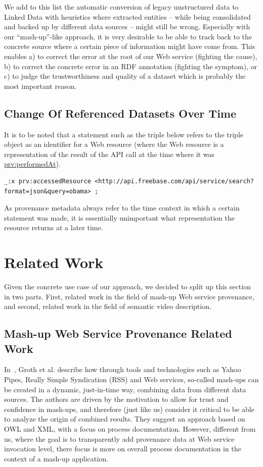\documentclass[conference]{IEEEtran}
\begin{document}
We add to this list the automatic conversion of legacy unstructured data to Linked Data with heuristics where extracted
entities -- while being consolidated and backed up by different data sources -- might still be wrong. Especially with our
``mash-up''-like approach, it is very desirable to be able to track back to the concrete source where a certain piece
of information might have come from. This enables a) to correct the error at the root of our Web service (fighting the
cause), b) to correct the concrete error in an RDF annotation (fighting the symptom), or c) to judge the
trustworthiness and quality of a dataset which is probably the most important reason.

\subsection{Change Of Referenced Datasets Over Time}                        \label{sec:change}
It is to be noted that a statement such as the triple below refers to the triple object as an identifier for a Web
resource (where the Web resource is a representation of the result of the API call at the time where it was
\url{prv:performedAt}).
\begin{lstlisting}
_:x prv:accessedResource <http://api.freebase.com/api/service/search?format=json&query=obama> ;
\end{lstlisting}
As provenance metadata always refer to the time context in which a certain statement was made, it is essentially
unimportant what representation the resource returns at a later time.


\section{Related Work}\label{sec:related}
Given the concrete use case of our approach, we decided to split up this section in two parts. First, related work in the field of mash-up Web service provenance, and second, related work in the field of semantic video description.

\subsection{Mash-up Web Service Provenance Related Work}
In~\cite{Groth:2009:MPD:1462159.1462162}, Groth et al. describe how through tools and technologies such as Yahoo Pipes, Really Simple Syndication (RSS) and Web services, so-called mash-ups can be created in a dynamic, just-in-time way, combining data from different data sources. The authors are driven by the motivation to allow for trust and confidence in mash-ups, and therefore (just like us) consider it critical to be able to analyze the origin of combined results. They suggest an approach based on OWL and XML, with a focus on process documentation. However, different from us, where the goal is to transparently add provenance data at Web service invocation level, there focus is more on overall process documentation in the context of a mash-up application.
\end{document}
